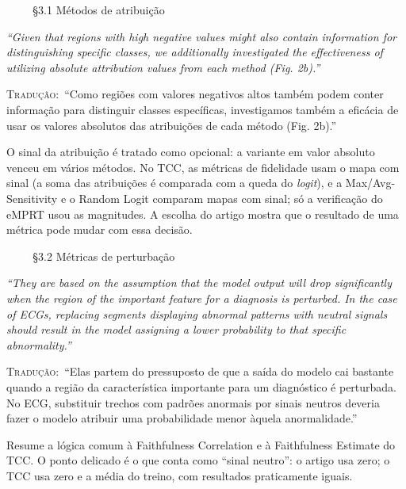 \documentclass[11pt,a4paper]{article}
\newcommand{\pagechip}[1]{{\setlength{\fboxsep}{1.5pt}\colorbox{cAcc}{\textcolor{white}{\scriptsize\texttt{#1}}}}}
\newenvironment{origquote}{\par\itshape\small}{\par}
\newenvironment{tradquote}{\par\small\textsc{Tradução:}\ }{\par}
\newcommand{\explab}[1]{\par\smallskip{\small\color{cAcc}\textbf{\MakeUppercase{#1}}}\par}
\begin{document}
\begin{citacard}{\pagechip{p. 3} §3.1 Métodos de atribuição}
\begin{origquote}“Given that regions with high negative values might also contain information for distinguishing specific classes, we additionally investigated the effectiveness of utilizing absolute attribution values from each method (Fig. 2b).”\end{origquote}
\begin{tradquote}“Como regiões com valores negativos altos também podem conter informação para distinguir classes específicas, investigamos também a eficácia de usar os valores absolutos das atribuições de cada método (Fig. 2b).”\end{tradquote}
\explab{Explicação}
O sinal da atribuição é tratado como opcional: a variante em valor absoluto venceu em vários métodos. No TCC, as métricas de fidelidade usam o mapa com sinal (a soma das atribuições é comparada com a queda do \textit{logit}), e a Max/Avg-Sensitivity e o Random Logit comparam mapas com sinal; só a verificação do eMPRT usou as magnitudes. A escolha do artigo mostra que o resultado de uma métrica pode mudar com essa decisão.
\end{citacard}

\begin{citacard}{\pagechip{p. 4} §3.2 Métricas de perturbação}
\begin{origquote}“They are based on the assumption that the model output will drop significantly when the region of the important feature for a diagnosis is perturbed. In the case of ECGs, replacing segments displaying abnormal patterns with neutral signals should result in the model assigning a lower probability to that specific abnormality.”\end{origquote}
\begin{tradquote}“Elas partem do pressuposto de que a saída do modelo cai bastante quando a região da característica importante para um diagnóstico é perturbada. No ECG, substituir trechos com padrões anormais por sinais neutros deveria fazer o modelo atribuir uma probabilidade menor àquela anormalidade.”\end{tradquote}
\explab{Explicação}
Resume a lógica comum à Faithfulness Correlation e à Faithfulness Estimate do TCC. O ponto delicado é o que conta como “sinal neutro”: o artigo usa zero; o TCC usa zero e a média do treino, com resultados praticamente iguais.
\end{citacard}
\end{document}
